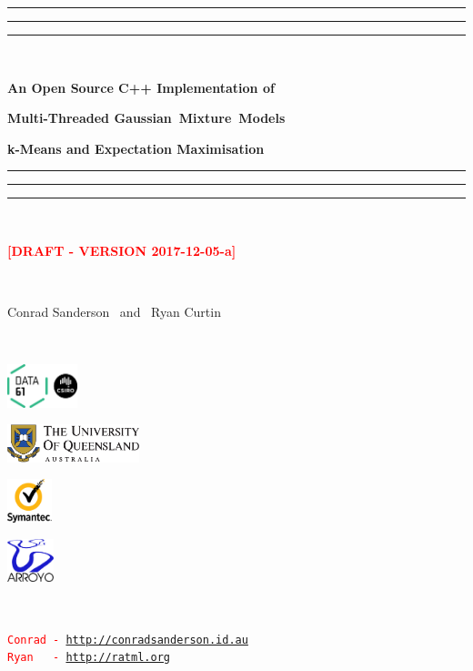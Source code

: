 \documentclass[usenames,dvipsnames]{beamer}
\begin{document}
\begin{frame}
\textcolor{ForestGreen}{\hrule}
\textcolor{ForestGreen}{\hrule}
\textcolor{ForestGreen}{\hrule}
\centerline{~}
\centerline{\Large\bf An Open Source C++ Implementation of}
\centerline{\Large\bf Multi-Threaded Gaussian~Mixture~Models}
\centerline{\Large\bf k-Means and Expectation Maximisation}
\vspace{-1ex}
\textcolor{ForestGreen}{\hrule}
\textcolor{ForestGreen}{\hrule}
\textcolor{ForestGreen}{\hrule}
\centerline{~}
\centerline{\textcolor{red}{\bf [DRAFT - VERSION 2017-12-05-a]}}
\centerline{~}
\centerline{\large Conrad Sanderson ~and~ Ryan Curtin}
\centerline{~}

\begin{center}
\begin{minipage}{1\textwidth}
\centering

\begin{minipage}{0.24\textwidth}
\centering
\includegraphics[height=1.25cm]{data61_logo_scaled_crop.png}
\end{minipage}
\begin{minipage}{0.35\textwidth}
\centering
\includegraphics[height=1.10cm]{UQ_logo.pdf}
\end{minipage}
\begin{minipage}{0.17\textwidth}
\centering
\includegraphics[height=1.25cm]{symantec_logo.pdf}
\end{minipage}
\begin{minipage}{0.17\textwidth}
\centering
\includegraphics[height=1.25cm]{arroyo_logo.png}
\end{minipage}

\end{minipage}
\end{center}

\centerline{~}


\begin{center}
\begin{minipage}{0.5\textwidth}
{\large\textcolor{red}{\small\texttt{Conrad~-~\href{http://conradsanderson.id.au}{http://conradsanderson.id.au}}}}\\
{\large\textcolor{red}{\small\texttt{Ryan~~~-~\href{http://ratml.org}{http://ratml.org}}}}
\end{minipage}
\end{center}

\end{frame}
\end{document}

